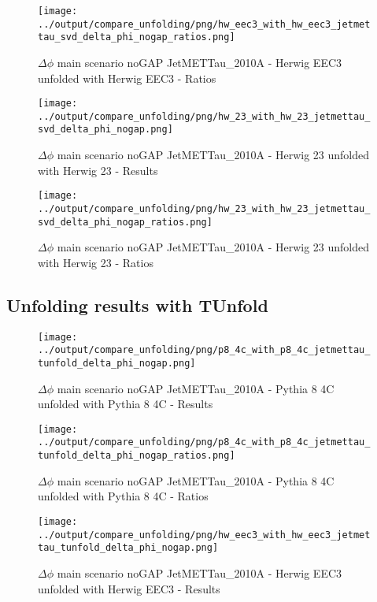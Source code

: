 \documentclass[11pt]{book}
\begin{document}
\begin{figure}[ht]
\centering
\texttt{[image: ../output/compare\_unfolding/png/hw\_eec3\_with\_hw\_eec3\_jetmettau\_svd\_delta\_phi\_nogap\_ratios.png]}
\caption{$\Delta\phi$ main scenario noGAP JetMETTau\_2010A - Herwig EEC3 unfolded with Herwig EEC3 - Ratios}
\label{hw_eec3_hw_eec3_jetmettau_svd_delta_phi_nogap_b}
\end{figure}

\begin{figure}[ht]
\centering
\texttt{[image: ../output/compare\_unfolding/png/hw\_23\_with\_hw\_23\_jetmettau\_svd\_delta\_phi\_nogap.png]}
\caption{$\Delta\phi$ main scenario noGAP JetMETTau\_2010A - Herwig 23 unfolded with Herwig 23 - Results}
\label{hw_23_hw_23_jetmettau_svd_delta_phi_nogap_a}
\end{figure}

\begin{figure}[ht]
\centering
\texttt{[image: ../output/compare\_unfolding/png/hw\_23\_with\_hw\_23\_jetmettau\_svd\_delta\_phi\_nogap\_ratios.png]}
\caption{$\Delta\phi$ main scenario noGAP JetMETTau\_2010A - Herwig 23 unfolded with Herwig 23 - Ratios}
\label{hw_23_hw_23_jetmettau_svd_delta_phi_nogap_b}
\end{figure}


\clearpage
\subsection{Unfolding results with TUnfold}

\begin{figure}[ht]
\centering
\texttt{[image: ../output/compare\_unfolding/png/p8\_4c\_with\_p8\_4c\_jetmettau\_tunfold\_delta\_phi\_nogap.png]}
\caption{$\Delta\phi$ main scenario noGAP JetMETTau\_2010A - Pythia 8 4C unfolded with Pythia 8 4C - Results}
\label{p8_p8_jetmettau_tunfold_delta_phi_nogap_a}
\end{figure}

\begin{figure}[ht]
\centering
\texttt{[image: ../output/compare\_unfolding/png/p8\_4c\_with\_p8\_4c\_jetmettau\_tunfold\_delta\_phi\_nogap\_ratios.png]}
\caption{$\Delta\phi$ main scenario noGAP JetMETTau\_2010A - Pythia 8 4C unfolded with Pythia 8 4C - Ratios}
\label{p8_p8_jetmettau_tunfold_delta_phi_nogap_b}
\end{figure}

\begin{figure}[ht]
\centering
\texttt{[image: ../output/compare\_unfolding/png/hw\_eec3\_with\_hw\_eec3\_jetmettau\_tunfold\_delta\_phi\_nogap.png]}
\caption{$\Delta\phi$ main scenario noGAP JetMETTau\_2010A - Herwig EEC3 unfolded with Herwig EEC3 - Results}
\label{hw_eec3_hw_eec3_jetmettau_tunfold_delta_phi_nogap_a}
\end{figure}
\end{document}
